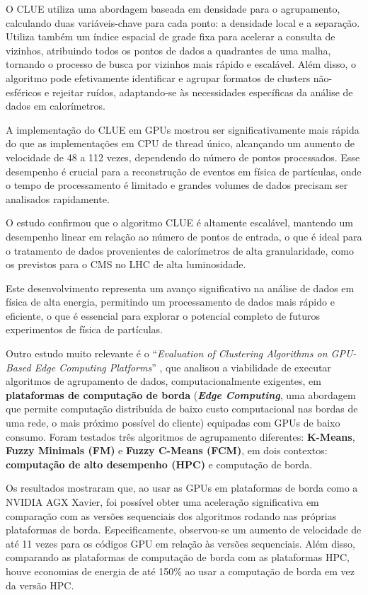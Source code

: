 \documentclass[12pt,
openright, 
oneside, %
a4paper,    %
brazil]{facom-ufu-abntex2}
\begin{document}
O CLUE utiliza uma abordagem baseada em densidade para o agrupamento, calculando duas variáveis-chave para cada ponto: a densidade local e a separação. Utiliza também um índice espacial de grade fixa para acelerar a consulta de vizinhos, atribuindo todos os pontos de dados a quadrantes de uma malha, tornando o processo de busca por vizinhos mais rápido e escalável. Além disso, o algoritmo pode efetivamente identificar e agrupar formatos de clusters não-esféricos e rejeitar ruídos, adaptando-se às necessidades específicas da análise de dados em calorímetros.

A implementação do CLUE em GPUs mostrou ser significativamente mais rápida do que as implementações em CPU de thread único, alcançando um aumento de velocidade de 48 a 112 vezes, dependendo do número de pontos processados. Esse desempenho é crucial para a reconstrução de eventos em física de partículas, onde o tempo de processamento é limitado e grandes volumes de dados precisam ser analisados rapidamente.

O estudo confirmou que o algoritmo CLUE é altamente escalável, mantendo um desempenho linear em relação ao número de pontos de entrada, o que é ideal para o tratamento de dados provenientes de calorímetros de alta granularidade, como os previstos para o CMS no LHC de alta luminosidade.

Este desenvolvimento representa um avanço significativo na análise de dados em física de alta energia, permitindo um processamento de dados mais rápido e eficiente, o que é essencial para explorar o potencial completo de futuros experimentos de física de partículas.

Outro estudo muito relevante é o \enquote{\textit{Evaluation of Clustering Algorithms on GPU-Based Edge Computing Platforms}} \cite{edgeComputingGPUsIOT2020}, que analisou a viabilidade de executar algoritmos de agrupamento de dados, computacionalmente exigentes, em \textbf{plataformas de computação de borda} (\textbf{\textit{Edge Computing}}, uma abordagem que permite computação distribuída de baixo custo computacional nas bordas de uma rede, o mais próximo possível do cliente) equipadas com GPUs de baixo consumo. Foram testados três algoritmos de agrupamento diferentes: \textbf{K-Means}, \textbf{Fuzzy Minimals (FM)} e \textbf{Fuzzy C-Means (FCM)}, em dois contextos: \textbf{computação de alto desempenho (HPC)} e computação de borda.

Os resultados mostraram que, ao usar as GPUs em plataformas de borda como a NVIDIA AGX Xavier, foi possível obter uma aceleração significativa em comparação com as versões sequenciais dos algoritmos rodando nas próprias plataformas de borda. Especificamente, observou-se um aumento de velocidade de até 11 vezes para os códigos GPU em relação às versões sequenciais. Além disso, comparando as plataformas de computação de borda com as plataformas HPC, houve economias de energia de até 150\% ao usar a computação de borda em vez da versão HPC.
\end{document}
